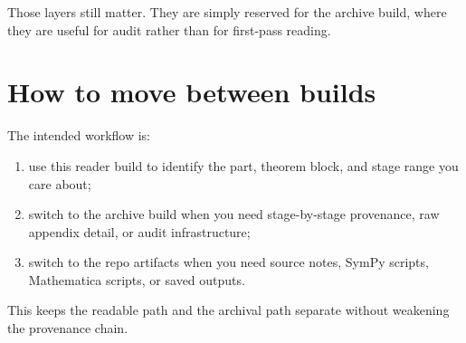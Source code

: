 Those layers still matter. They are simply reserved for the archive build, where
they are useful for audit rather than for first-pass reading.

\section{How to move between builds}

The intended workflow is:
\begin{enumerate}[leftmargin=2.2em]
  \item use this reader build to identify the part, theorem block, and stage
  range you care about;
  \item switch to the archive build when you need stage-by-stage provenance,
  raw appendix detail, or audit infrastructure;
  \item switch to the repo artifacts when you need source notes, SymPy scripts,
  Mathematica scripts, or saved outputs.
\end{enumerate}

This keeps the readable path and the archival path separate without weakening
the provenance chain.
